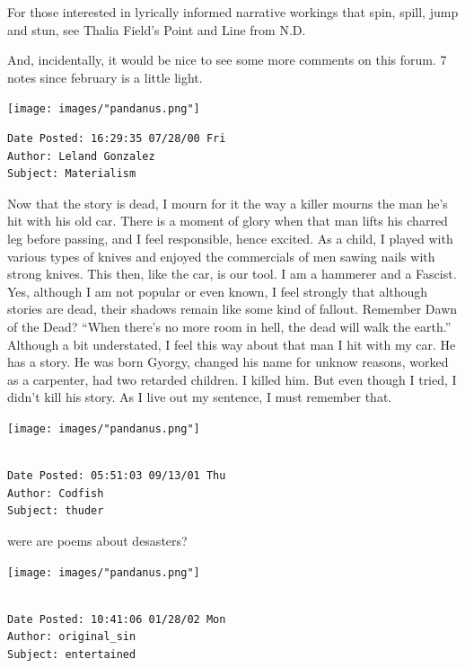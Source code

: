 \documentclass[
]{memoir}
\begin{document}
For those interested in lyrically informed narrative workings that spin,
spill, jump and stun, see Thalia Field's Point and Line from N.D.

And, incidentally, it would be nice to see some more comments on this
forum. 7 notes since february is a little light.

\begin{center}\texttt{[image: images/"pandanus.png"]}\end{center}

\begin{verbatim}
Date Posted: 16:29:35 07/28/00 Fri
Author: Leland Gonzalez
Subject: Materialism
\end{verbatim}

Now that the story is dead, I mourn for it the way a killer mourns the
man he's hit with his old car. There is a moment of glory when that man
lifts his charred leg before passing, and I feel responsible, hence
excited. As a child, I played with various types of knives and enjoyed
the commercials of men sawing nails with strong knives. This then, like
the car, is our tool. I am a hammerer and a Fascist. Yes, although I am
not popular or even known, I feel strongly that although stories are
dead, their shadows remain like some kind of fallout. Remember Dawn of
the Dead? ``When there's no more room in hell, the dead will walk the
earth.'' Although a bit understated, I feel this way about that man I
hit with my car. He has a story. He was born Gyorgy, changed his name
for unknow reasons, worked as a carpenter, had two retarded children. I
killed him. But even though I tried, I didn't kill his story. As I live
out my sentence, I must remember that.

\begin{center}\texttt{[image: images/"pandanus.png"]}\end{center}

\begin{verbatim}

Date Posted: 05:51:03 09/13/01 Thu
Author: Codfish
Subject: thuder
\end{verbatim}

were are poems about desasters?

\begin{center}\texttt{[image: images/"pandanus.png"]}\end{center}

\begin{verbatim}

Date Posted: 10:41:06 01/28/02 Mon
Author: original_sin
Subject: entertained
\end{verbatim}
\end{document}
